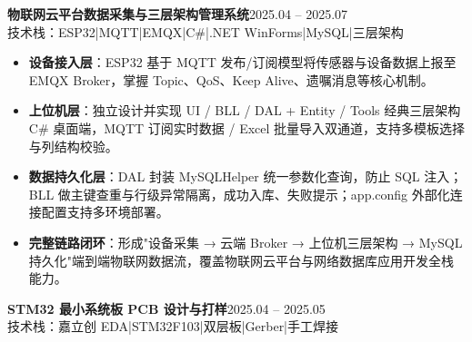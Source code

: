 \documentclass[10pt,a4paper]{article}
\newcommand{\projectblock}[3]{%
    {\bfseries\color{darktext}#1}\hfill{\color{graytext}#2}\\%
    {\small\color{graytext}#3}%
    \vspace{0.2em}%
}
\begin{document}
\vspace{0.15em}

\projectblock{物联网云平台数据采集与三层架构管理系统}{2025.04 -- 2025.07}{技术栈：ESP32\hspace{0.3em}|\hspace{0.3em}MQTT\hspace{0.3em}|\hspace{0.3em}EMQX\hspace{0.3em}|\hspace{0.3em}C\#\hspace{0.3em}|\hspace{0.3em}.NET WinForms\hspace{0.3em}|\hspace{0.3em}MySQL\hspace{0.3em}|\hspace{0.3em}三层架构}

\begin{itemize}[leftmargin=1.5em, itemsep=2pt, parsep=0pt, topsep=2pt]
    \item \textbf{设备接入层}：ESP32 基于 MQTT 发布/订阅模型将传感器与设备数据上报至 EMQX Broker，掌握 Topic、QoS、Keep Alive、遗嘱消息等核心机制。
    \item \textbf{上位机层}：独立设计并实现 UI / BLL / DAL + Entity / Tools 经典三层架构 C\# 桌面端，MQTT 订阅实时数据 / Excel 批量导入双通道，支持多模板选择与列结构校验。
    \item \textbf{数据持久化层}：DAL 封装 MySQLHelper 统一参数化查询，防止 SQL 注入；BLL 做主键查重与行级异常隔离，成功入库、失败提示；app.config 外部化连接配置支持多环境部署。
    \item \textbf{完整链路闭环}：形成"设备采集 → 云端 Broker → 上位机三层架构 → MySQL 持久化"端到端物联网数据流，覆盖物联网云平台与网络数据库应用开发全栈能力。
\end{itemize}

\vspace{0.15em}

\projectblock{STM32 最小系统板 PCB 设计与打样}{2025.04 -- 2025.05}{技术栈：嘉立创 EDA\hspace{0.3em}|\hspace{0.3em}STM32F103\hspace{0.3em}|\hspace{0.3em}双层板\hspace{0.3em}|\hspace{0.3em}Gerber\hspace{0.3em}|\hspace{0.3em}手工焊接}
\end{document}

